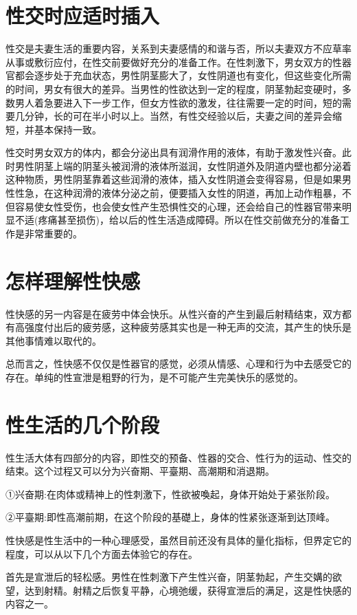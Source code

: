 \documentclass[12pt,UTF8]{ctexbook}
\begin{document}
\section{性交时应适时插入}

性交是夫妻生活的重要内容，关系到夫妻感情的和谐与否，所以夫妻双方不应草率从事或敷衍应付，在性交前要做好充分的准备工作。在性刺激下，男女双方的性器官都会逐步处于充血状态，男性阴茎膨大了，女性阴道也有变化，但这些变化所需的时间，男女有很大的差异。当男性的性欲达到一定的程度，阴茎勃起变硬时，多数男人着急要进入下一步工作，但女方性欲的激发，往往需要一定的时间，短的需要几分钟，长的可在半小时以上。当然，有性交经验以后，夫妻之间的差异会缩短，并基本保持一致。

性交时男女双方的体内，都会分泌出具有润滑作用的液体，有助于激发性兴奋。此时男性阴茎上端的阴茎头被润滑的液体所滋润，女性阴道外及阴道内壁也都分泌着这种物质，男性阴茎靠着这些润滑的液体，插入女性阴道会变得容易，但是如果男性性急，在这种润滑的液体分泌之前，便要插入女性的阴道，再加上动作粗暴，不但容易使女性受伤，也会使女性产生恐惧性交的心理，还会给自己的性器官带来明显不适(疼痛甚至损伤)，给以后的性生活造成障碍。所以在性交前做充分的准备工作是非常重要的。

\section{怎样理解性快感}

性快感的另一内容是在疲劳中体会快乐。从性兴奋的产生到最后射精结束，双方都有高强度付出后的疲劳感，这种疲劳感其实也是一种无声的交流，其产生的快乐是其他事情难以取代的。

总而言之，性快感不仅仅是性器官的感觉，必须从情感、心理和行为中去感受它的存在。单纯的性宣泄是粗野的行为，是不可能产生完美快乐的感觉的。

\section{性生活的几个阶段}

性生活大体有四部分的内容，即性交的预备、性器的交合、性行为的运动、性交的结束。这个过程又可以分为兴奋期、平臺期、高潮期和消退期。

①兴奋期:在肉体或精神上的性刺激下，性欲被喚起，身体开始处于紧张阶段。

②平臺期:即性高潮前期，在这个阶段的基礎上，身体的性紧张逐渐到达顶峰。


性快感是性生活中的一种心理感受，虽然目前还没有具体的量化指标，但界定它的程度，可以从以下几个方面去体验它的存在。

首先是宣泄后的轻松感。男性在性刺激下产生性兴奋，阴茎勃起，产生交媾的欲望，达到射精。射精之后恢复平静，心境弛缓，获得宣泄后的满足，这是性快感的内容之一。
\end{document}

